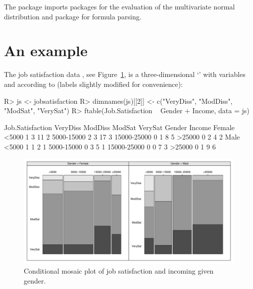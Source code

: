 \documentclass{Z}
\newcommand{\Rclass}[1]{`\code{#1}'}
\begin{document}
The  package imports packages 
\citep{PKG:mvtnorm} for the evaluation of the multivariate normal
distribution and package  \citep{PKG:modeltools} for
formula parsing.

\section{An example}

The job satisfaction data \citep[Table 7.8,][]{agresti2002}, see Figure~\ref{jsplot}, is a
three-dimensional \Rclass{table} with variables  and
 according to  (labels
slightly modified for convenience):
\begin{Schunk}
\begin{Sinput}
R> js <- jobsatisfaction
R> dimnames(js)[[2]] <- c("VeryDiss", "ModDiss", "ModSat", "VerySat")
R> ftable(Job.Satisfaction ~ Gender + Income, data = js)
\end{Sinput}
\begin{Soutput}
                   Job.Satisfaction VeryDiss ModDiss ModSat VerySat
Gender Income                                                      
Female <5000                               1       3     11       2
       5000-15000                          2       3     17       3
       15000-25000                         0       1      8       5
       >25000                              0       2      4       2
Male   <5000                               1       1      2       1
       5000-15000                          0       3      5       1
       15000-25000                         0       0      7       3
       >25000                              0       1      9       6
\end{Soutput}
\end{Schunk}
\begin{figure}
\begin{center}
\includegraphics{coin_implementation-js-plot}
\caption{Conditional mosaic plot of job satisfaction and incoming given gender.
         \label{jsplot}}
\end{center}
\end{figure}
\end{document}
